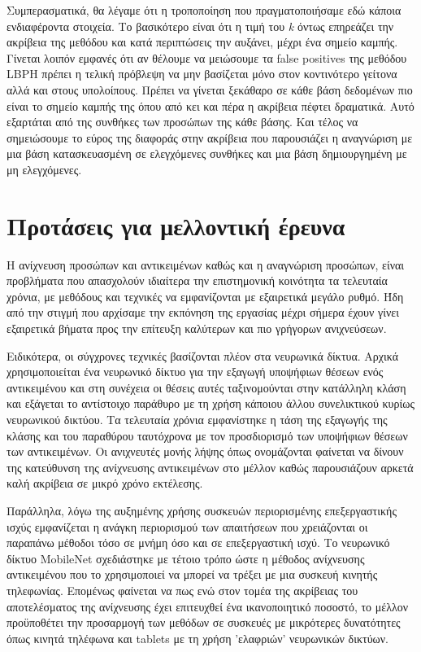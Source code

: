 Συμπερασματικά, θα λέγαμε ότι η τροποποίηση που πραγματοποιήσαμε εδώ κάποια ενδιαφέροντα
στοιχεία. Το βασικότερο είναι ότι η τιμή του \emph{k} όντως επηρεάζει την ακρίβεια
της μεθόδου και κατά περιπτώσεις την αυξάνει, μέχρι ένα σημείο καμπής. Γίνεται
λοιπόν εμφανές ότι αν θέλουμε να μειώσουμε τα false positives της μεθόδου LBPH πρέπει
η τελική πρόβλεψη να μην βασίζεται μόνο στον κοντινότερο γείτονα αλλά και στους υπολοίπους.
Πρέπει να γίνεται ξεκάθαρο σε κάθε βάση δεδομένων πιο είναι το σημείο καμπής της
όπου από κει και πέρα η ακρίβεια πέφτει δραματικά. Αυτό εξαρτάται από της συνθήκες
των προσώπων της κάθε βάσης. Και τέλος να σημειώσουμε το εύρος της διαφοράς στην ακρίβεια
που παρουσιάζει η αναγνώριση με μια βάση κατασκευασμένη σε ελεγχόμενες συνθήκες
και μια βάση δημιουργημένη με μη ελεγχόμενες.


\section{Προτάσεις για μελλοντική έρευνα}\label{sec:future}

Η ανίχνευση προσώπων και αντικειμένων καθώς και η αναγνώριση προσώπων, είναι
προβλήματα που απασχολούν ιδιαίτερα την επιστημονική κοινότητα τα τελευταία χρόνια,
με μεθόδους και τεχνικές να εμφανίζονται με εξαιρετικά μεγάλο ρυθμό. Ήδη από την
στιγμή που αρχίσαμε την εκπόνηση της εργασίας μέχρι σήμερα έχουν γίνει εξαιρετικά
βήματα προς την επίτευξη καλύτερων και πιο γρήγορων ανιχνεύσεων.

Ειδικότερα, οι σύγχρονες τεχνικές βασίζονται πλέον στα νευρωνικά δίκτυα. Αρχικά
χρησιμοποιείται ένα νευρωνικό δίκτυο για την εξαγωγή υποψήφιων θέσεων ενός
αντικειμένου και στη συνέχεια οι θέσεις αυτές ταξινομούνται στην κατάλληλη κλάση
και εξάγεται το αντίστοιχο παράθυρο με τη χρήση κάποιου άλλου συνελικτικού
κυρίως νευρωνικού δικτύου. Τα τελευταία χρόνια εμφανίστηκε η τάση της εξαγωγής
της κλάσης και του παραθύρου ταυτόχρονα με τον προσδιορισμό των υποψήφιων θέσεων
των αντικειμένων. Οι ανιχνευτές μονής λήψης όπως ονομάζονται φαίνεται να δίνουν
της κατεύθυνση της ανίχνευσης αντικειμένων στο μέλλον καθώς παρουσιάζουν αρκετά
καλή ακρίβεια σε μικρό χρόνο εκτέλεσης.

Παράλληλα, λόγω της αυξημένης χρήσης συσκευών περιορισμένης επεξεργαστικής ισχύς
εμφανίζεται η ανάγκη περιορισμού των απαιτήσεων που χρειάζονται οι παραπάνω μέθοδοι
τόσο σε μνήμη όσο και σε επεξεργαστική ισχύ. Το νευρωνικό δίκτυο MobileNet σχεδιάστηκε
με τέτοιο τρόπο ώστε η μέθοδος ανίχνευσης αντικειμένου που το χρησιμοποιεί να μπορεί
να τρέξει με μια συσκευή κινητής τηλεφωνίας. Επομένως φαίνεται να πως ενώ στον τομέα
της ακρίβειας του αποτελέσματος της ανίχνευσης έχει επιτευχθεί ένα ικανοποιητικό
ποσοστό, το μέλλον προϋποθέτει την προσαρμογή των μεθόδων σε συσκευές με μικρότερες
δυνατότητες όπως κινητά τηλέφωνα και tablets με τη χρήση 'ελαφριών' νευρωνικών
δικτύων.
